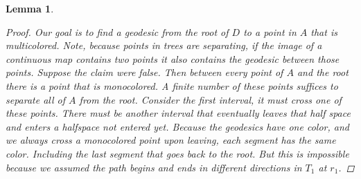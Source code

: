 \documentclass{article}
\theoremstyle{mystyle}
\newtheorem{lem}[thm]{Lemma}
\theoremstyle{remark}
\begin{document}
\begin{lem}
\begin{proof}
        Our goal is to find a geodesic from the root of \(D\) to a point in \(A\) that is multicolored. Note, because points in trees are separating, if the image of a continuous map contains two points it also contains the geodesic between those points. Suppose the claim were false. Then between every point of \(A\) and the root there is a point that is monocolored. A finite number of these points suffices to separate all of \(A\) from the root. Consider the first interval, it must cross one of these points. There must be another interval that eventually leaves that half space and enters a halfspace not entered yet. Because the geodesics have one color, and we always cross a monocolored point upon leaving, each segment has the same color. Including the last segment that goes back to the root. But this is impossible because we assumed the path begins and ends in different directions in \(T_{1}\) at \(r_{1}\).

    \end{proof}
\end{lem}
\end{document}
